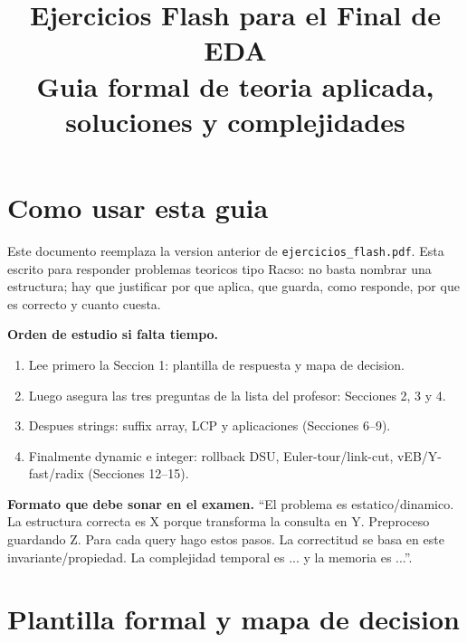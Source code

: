 \documentclass[10pt]{article}
\title{\vspace{-1.0cm}Ejercicios Flash para el Final de EDA\\
\large Guia formal de teoria aplicada, soluciones y complejidades}
\author{}
\date{}
\newcommand{\boxhead}[1]{\vspace{3pt}\textbf{#1.}}
\begin{document}
\maketitle
\vspace{-0.7cm}

\section*{Como usar esta guia}
Este documento reemplaza la version anterior de \texttt{ejercicios\_flash.pdf}. Esta escrito para responder
problemas teoricos tipo Racso: no basta nombrar una estructura; hay que justificar por que aplica, que guarda,
como responde, por que es correcto y cuanto cuesta.

\boxhead{Orden de estudio si falta tiempo}
\begin{enumerate}
\item Lee primero la Seccion 1: plantilla de respuesta y mapa de decision.
\item Luego asegura las tres preguntas de la lista del profesor: Secciones 2, 3 y 4.
\item Despues strings: suffix array, LCP y aplicaciones (Secciones 6--9).
\item Finalmente dynamic e integer: rollback DSU, Euler-tour/link-cut, vEB/Y-fast/radix (Secciones 12--15).
\end{enumerate}

\boxhead{Formato que debe sonar en el examen}
``El problema es estatico/dinamico. La estructura correcta es X porque transforma la consulta en Y.
Preproceso guardando Z. Para cada query hago estos pasos. La correctitud se basa en este invariante/propiedad.
La complejidad temporal es ... y la memoria es ...''.

\tableofcontents
\newpage

\section{Plantilla formal y mapa de decision}
\end{document}
